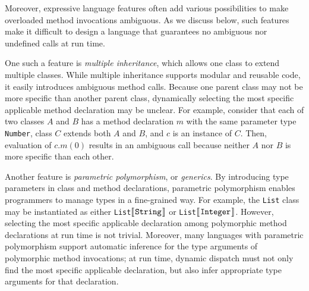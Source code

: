 Moreover, expressive language features often add various possibilities to
make overloaded method invocations ambiguous.  As we discuss below,
such features make it difficult to design a language that guarantees no
ambiguous nor undefined calls at run time.  

One such a feature is \textit{multiple inheritance}, which allows one
class to extend multiple classes.  While multiple inheritance supports
modular and reusable code, it easily introduces ambiguous method
calls.  Because one parent class may not be more specific than another
parent class, dynamically selecting the most specific applicable method
declaration may be unclear.  For example, consider that each of two
classes $A$ and $B$ has a method declaration $m$ with the same
parameter type \texttt{Number}, class $C$ extends both $A$ and $B$, and
$c$ is an instance of $C$.  Then, evaluation of $c.m(0)$ results in an
ambiguous call because neither $A$ nor $B$ is more specific than each
other.

Another feature is \textit{parametric polymorphism}, or \textit{generics}.
By introducing type parameters in class and method declarations,
parametric polymorphism enables programmers to manage types in a
fine-grained way.
For example, the \texttt{List} class may be instantiated as either
\texttt{List$\ob{\texttt{String}}$} or
\texttt{List$\ob{\texttt{Integer}}$}.
However,
selecting the most
specific applicable declaration among polymorphic method declarations
at run time is not trivial.
Moreover, many languages with parametric polymorphism support automatic
inference for the type arguments of polymorphic method invocations;
at run time, dynamic dispatch must not only find the most specific applicable
declaration, but also infer appropriate type arguments for that declaration.


